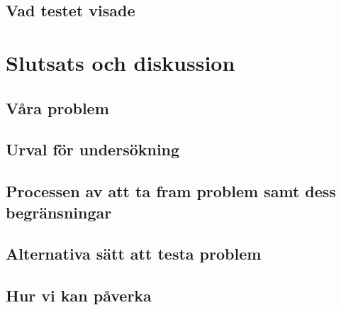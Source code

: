 \documentclass[11pt,a4paper]{article}
\begin{document}
    \subsection{Vad testet visade}
    \label{sec:slutenkat}
    

\section{Slutsats och diskussion}%
    
    

    \subsection{Våra problem}
        
        
    \subsection{Urval för undersökning}
        

    \subsection{Processen av att ta fram problem samt dess begränsningar}
        
        
    \subsection{Alternativa sätt att testa problem}
        
        
    \subsection{Hur vi kan påverka}
        
\end{document}
